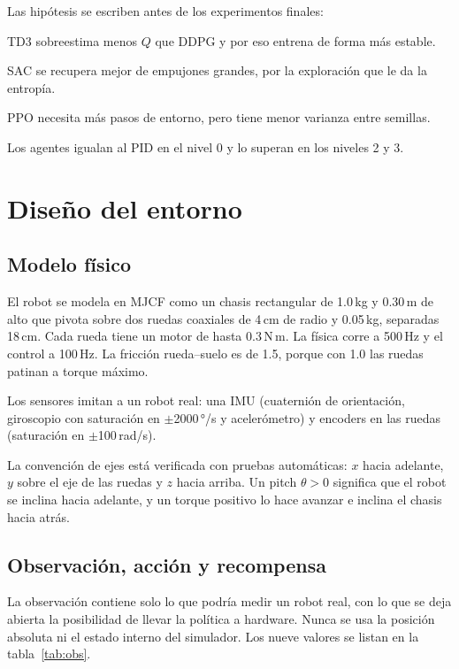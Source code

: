 \documentclass[11pt,a4paper]{article}
\newcommand{\SI}[2]{#1\,#2}  %
\begin{document}
Las hipótesis se escriben antes de los experimentos finales:
\begin{description}[font=\normalfont\bfseries]
  \item[H1] TD3 sobreestima menos $Q$ que DDPG y por eso entrena de forma más estable.
  \item[H2] SAC se recupera mejor de empujones grandes, por la exploración que le da la entropía.
  \item[H3] PPO necesita más pasos de entorno, pero tiene menor varianza entre semillas.
  \item[H4] Los agentes igualan al PID en el nivel 0 y lo superan en los niveles 2 y 3.
\end{description}

\section{Diseño del entorno}

\subsection{Modelo físico}

El robot se modela en MJCF como un chasis rectangular de \SI{1.0}{kg} y \SI{0.30}{m} de alto que pivota sobre dos ruedas coaxiales de \SI{4}{cm} de radio y \SI{0.05}{kg}, separadas \SI{18}{cm}. Cada rueda tiene un motor de hasta \SI{0.3}{N\,m}. La física corre a \SI{500}{Hz} y el control a \SI{100}{Hz}. La fricción rueda--suelo es de 1.5, porque con 1.0 las ruedas patinan a torque máximo.

Los sensores imitan a un robot real: una IMU (cuaternión de orientación, giroscopio con saturación en $\pm$\SI{2000}{°/s} y acelerómetro) y encoders en las ruedas (saturación en $\pm$\SI{100}{rad/s}).

La convención de ejes está verificada con pruebas automáticas: $x$ hacia adelante, $y$ sobre el eje de las ruedas y $z$ hacia arriba. Un pitch $\theta>0$ significa que el robot se inclina hacia adelante, y un torque positivo lo hace avanzar e inclina el chasis hacia atrás.

\subsection{Observación, acción y recompensa}

La observación contiene solo lo que podría medir un robot real, con lo que se deja abierta la posibilidad de llevar la política a hardware. Nunca se usa la posición absoluta ni el estado interno del simulador. Los nueve valores se listan en la tabla~\ref{tab:obs}.
\end{document}
